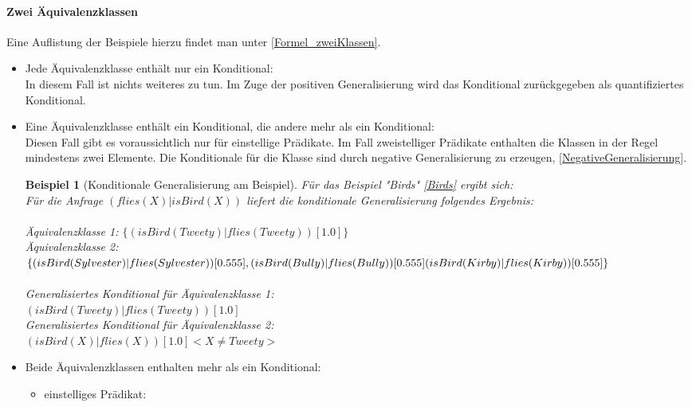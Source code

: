 \documentclass[draft]{scrreprt}
\newtheorem{Bsp}{Beispiel}[section]
\begin{document}
\paragraph{Zwei Äquivalenzklassen}
Eine Auflistung der Beispiele hierzu findet man unter \ref{Formel_zweiKlassen}.
\begin{itemize}
	\item Jede Äquivalenzklasse enthält nur ein Konditional:\\
	In diesem Fall ist nichts weiteres zu tun. Im Zuge der positiven Generalisierung wird das Konditional zurückgegeben als quantifiziertes Konditional.
	\item Eine Äquivalenzklasse enthält ein Konditional, die andere mehr als ein Konditional:\\ %
	Diesen Fall gibt es voraussichtlich nur für einstellige Prädikate. Im Fall zweistelliger Prädikate enthalten die Klassen in der Regel mindestens zwei Elemente.  Die Konditionale für die Klasse sind durch negative Generalisierung zu erzeugen, \ref{NegativeGeneralisierung}. 
	\begin{Bsp}[Konditionale Generalisierung am Beispiel]
	Für das Beispiel "{}Birds"{} \ref{Birds} ergibt sich:\\
	Für die Anfrage $ (flies(X) | isBird(X)) $ liefert die konditionale Generalisierung folgendes Ergebnis:\\
	\\
	Äquivalenzklasse 1: $ \{(isBird(Tweety)|flies(Tweety))[1.0]\} $\\
	Äquivalenzklasse 2: $ \{(isBird(Sylvester)|flies(Sylvester))[0.555],\\ (isBird(Bully)|flies(Bully))[0.555] (isBird(Kirby)|flies(Kirby))[0.555] \}  $\\
	\\
	Generalisiertes Konditional für Äquivalenzklasse 1:\\ $ (isBird(Tweety)|flies(Tweety))[1.0]$\\
	Generalisiertes Konditional für Äquivalenzklasse 2:\\ $ (isBird(X)|flies(X))[1.0] <X \neq Tweety>$\\
	\end{Bsp}
	\item Beide Äquivalenzklassen enthalten mehr als ein Konditional:\\
	\begin{itemize}
		\item einstelliges Prädikat:\\

\end{itemize}
\end{itemize}
\end{document}
